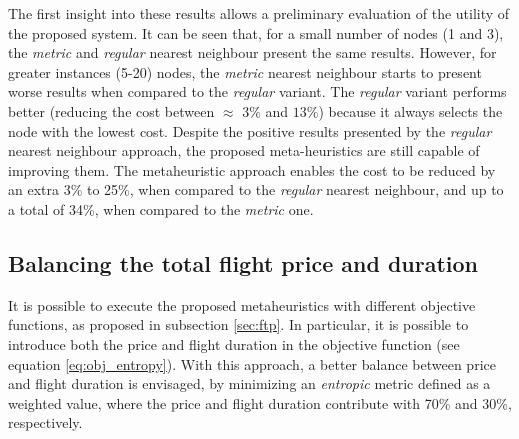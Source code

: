 The first insight into these results allows a preliminary evaluation of the utility of the proposed system. It can be seen that, for a small number of nodes (1 and 3), the \textit{metric} and \textit{regular} nearest neighbour present the same results. However, for greater instances (5-20) nodes, the \textit{metric} nearest neighbour starts to present worse results when compared to the \textit{regular} variant. The \textit{regular} variant performs better (reducing the cost between $\approx$ $3\%$ and $13\%$) because it always selects the node with the lowest cost. Despite the positive results presented by the \textit{regular} nearest neighbour approach, the proposed meta-heuristics are still capable of improving them. The metaheuristic approach enables the cost to be reduced by an extra 3\% to 25\%, when compared to the \textit{regular} nearest neighbour, and up to a total of 34\%, when compared to the \textit{metric} one. 



\subsection{Balancing the total flight price and duration}
\label{sec:ftp_obj_func_eval}

It is possible to execute the proposed metaheuristics with different objective functions, as proposed in subsection \ref{sec:ftp}. In particular, it is possible to introduce both the price and flight duration in the objective function (see equation \ref{eq:obj_entropy}). With this approach, a better balance between price and flight duration is envisaged, by minimizing an \textit{entropic} metric defined as a weighted value, where the price and flight duration contribute with 70\% and 30\%, respectively.

